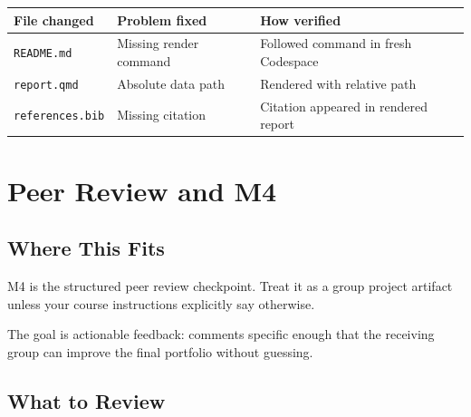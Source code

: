 \documentclass[
  letterpaper,
  DIV=11,
  numbers=noendperiod,
  oneside]{scrreprt}
\begin{document}
\begin{longtable}[]{@{}
  >{\raggedright\arraybackslash}p{}
  >{\raggedright\arraybackslash}p{}
  >{\raggedright\arraybackslash}p{}@{}}
\toprule\noalign{}
\begin{minipage}[b]{\linewidth}\raggedright
File changed
\end{minipage} & \begin{minipage}[b]{\linewidth}\raggedright
Problem fixed
\end{minipage} & \begin{minipage}[b]{\linewidth}\raggedright
How verified
\end{minipage} \\
\midrule\noalign{}
\endhead
\bottomrule\noalign{}
\endlastfoot
\texttt{README.md} & Missing render command & Followed command in fresh
Codespace \\
\texttt{report.qmd} & Absolute data path & Rendered with relative
path \\
\texttt{references.bib} & Missing citation & Citation appeared in
rendered report \\
\end{longtable}

\chapter*{Peer Review and M4}\label{peer-review-and-m4}


\section*{Where This Fits}\label{where-this-fits-24}


M4 is the structured peer review checkpoint. Treat it as a group project
artifact unless your course instructions explicitly say otherwise.

The goal is actionable feedback: comments specific enough that the
receiving group can improve the final portfolio without guessing.

\section*{What to Review}\label{what-to-review}
\end{document}

